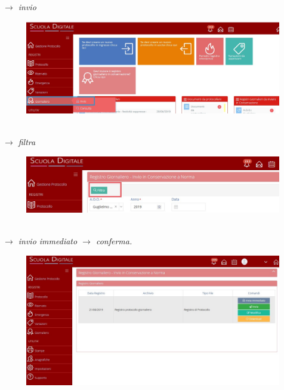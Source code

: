 \documentclass[a4paper,italian,12pt]{book}
\begin{document}
\\
\\
\\
\\
\\
\textit{$\to$ invio} 
\begin{figure}[ht]
\includegraphics[scale=0.4]{Figure/giorn_invio.jpg} 
\end{figure}\\
\textit{$\to$ filtra}\\
\begin{figure}[ht]
\centering
\includegraphics[scale=0.6]{Figure/filtra.jpg} 
\end{figure}\\
\textit{ $\to$ invio immediato $\to$ conferma.}
\begin{figure}[ht]
\includegraphics[scale=0.35]{Figure/invio_cons.jpg} 
\end{figure} \\
\end{document}
